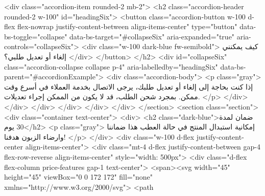             <div class="accordion-item rounded-2 mb-2">
              <h2 class="accordion-header rounded-2 w-100" id="headingSix">
                <button class="accordion-button w-100 d-flex flex-nowrap justify-content-between align-items-center"
                  type="button" data-bs-toggle="collapse" data-bs-target="#collapseSix" aria-expanded="true"
                  aria-controls="collapseSix">
                  <div class="w-100 dark-blue fw-semibold">
                    كيف يمكنني إلغاء أو تعديل طلبي؟
                  </div>
                </button>
              </h2>
              <div id="collapseSix" class="accordion-collapse collapse p-4" aria-labelledby="headingSix"
                data-bs-parent="#accordionExample">
                <div class="accordion-body">
                  <p class="gray">
                    إذا كنت بحاجة إلى إلغاء أو تعديل طلبك، يرجى الاتصال بخدمة
                    العملاء في أسرع وقت ممكن. بمجرد شحن الطلب، قد لا يكون من
                    الممكن إجراء تعديلات.
                  </p>
                </div>
              </div>
            </div>
          </div>
        </div>
      </div>
    </section>
    <section class="section">
      <div class="container text-center">
        <div>
          <h2 class="dark-blue">ضمان لمدة 30 يوم</h2>
          <p class="gray">
            إمكانية استبدال المنتج في حالة العطب هذا ضماننا وارضاء الزبون هدفنا!
          </p>
        </div>
        <div class="w-100 d-flex justify-content-center align-items-center">
          <div class="mt-4 d-flex justify-content-between gap-4 flex-row-reverse align-items-center"
            style="width: 500px">
            <div class="d-flex flex-column price-features gap-1 text-center">
              <span><svg width="45" height="45" viewBox="0 0 172 172" fill="none"
                  xmlns="http://www.w3.org/2000/svg">
                  <path

